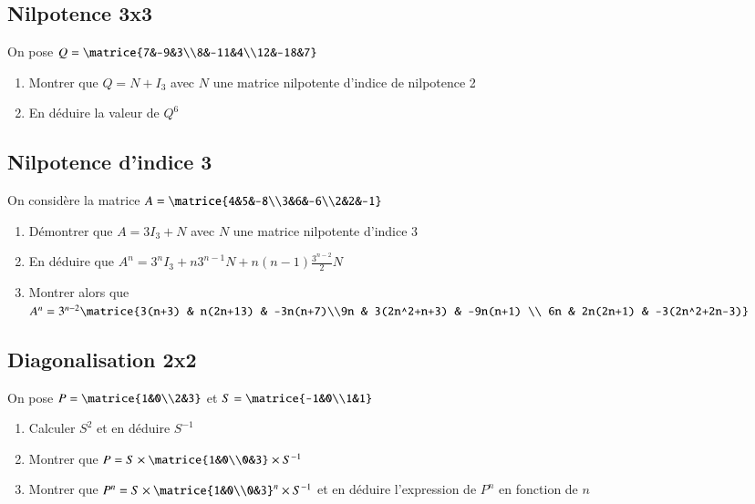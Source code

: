 \documentclass[oneside,12pt]{article}          %
\begin{document}
    
\subsection{Nilpotence 3x3}
On pose $Q=\matrice{7&-9&3\\8&-11&4\\12&-18&7} $ 
    \begin{enumerate}
        \item Montrer que $Q=N+I_3$ avec $N$ une matrice nilpotente d'indice de nilpotence 2
        \item En déduire la valeur de $Q^6$
    \end{enumerate}



\subsection{Nilpotence d'indice 3}
On considère la matrice $A=\matrice{4&5&-8\\3&6&-6\\2&2&-1}$
\begin{enumerate}
    \item Démontrer que $A=3I_3+N$ avec $N$ une matrice nilpotente d'indice 3
    \item En déduire que $A^n=3^nI_3+n3^{n-1}N+n(n-1)\frac{3^{n-2}}{2}N$
    \item Montrer alors que $A^n=3^{n-2}\matrice{3(n+3) & n(2n+13) & -3n(n+7)\\9n & 3(2n^2+n+3) & -9n(n+1) \\ 6n & 2n(2n+1) & -3(2n^2+2n-3)}$
\end{enumerate}



\subsection{Diagonalisation 2x2}
On pose $P=\matrice{1&0\\2&3} $ et $S=\matrice{-1&0\\1&1} $
\begin{enumerate}
    \item Calculer $S^2$ et en déduire $S^{-1}$
    \item Montrer que $P=S\times\matrice{1&0\\0&3}\times S^{-1}$
    \item Montrer que $P^n=S\times\matrice{1&0\\0&3}^n\times S^{-1}$ et en déduire l'expression de $P^n$ en fonction de $n$
\end{enumerate}
\end{document}
